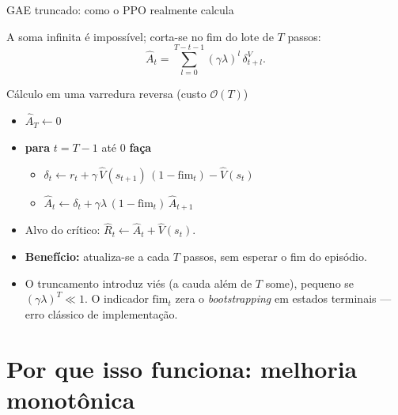 \documentclass[aspectratio=169, 10pt]{beamer}
\newcommand{\Vhat}{\hat{V}}
\newcommand{\Ahat}{\hat{A}}
\begin{document}
\begin{frame}{GAE truncado: como o PPO realmente calcula}

  A soma infinita é impossível; corta-se no fim do lote de $T$ passos:
  \[
    \Ahat_t = \sum_{l=0}^{T-t-1}(\gamma\lambda)^l\,\delta^V_{t+l}.
  \]

  \begin{algbox}{Cálculo em uma varredura reversa (custo $\mathcal{O}(T)$)}
  \begin{itemize}\setlength{\itemsep}{0.1em}
    \item $\Ahat_{T} \leftarrow 0$
    \item \textbf{para} $t = T-1$ até $0$ \textbf{faça}
      \begin{itemize}
        \item $\delta_t \leftarrow r_t + \gamma\,\Vhat(s_{t+1})\,(1-\mathrm{fim}_t) - \Vhat(s_t)$
        \item $\Ahat_t \leftarrow \delta_t + \gamma\lambda\,(1-\mathrm{fim}_t)\,\Ahat_{t+1}$
      \end{itemize}
    \item Alvo do crítico: $\hat R_t \leftarrow \Ahat_t + \Vhat(s_t)$.
  \end{itemize}
  \end{algbox}

  \begin{itemize}\setlength{\itemsep}{0.2ex}
    \item \textbf{Benefício:} atualiza-se a cada $T$ passos, sem esperar o fim do episódio.
    \item O truncamento introduz viés (a cauda além de $T$ some), pequeno se
      $(\gamma\lambda)^{T}\ll1$. O indicador $\mathrm{fim}_t$ zera o \emph{bootstrapping}
      em estados terminais --- erro clássico de implementação.
  \end{itemize}
\end{frame}

\section{Por que isso funciona: melhoria monotônica}
\end{document}
